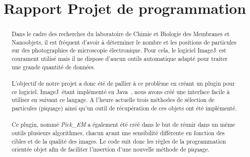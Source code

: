 \documentclass[12pt,a4paper]{report}
\title{Rapport Projet de programmation}
\begin{document}

\newcommand{\cme}{cryo-MET}
\newcommand{\me}{MET}
\newcommand{\java}{Java~{\tiny \texttrademark}}
\newcommand{\js}{JavaScript}
\newcommand{\imj}{ImageJ}
\renewcommand{\thefigure}{\arabic{figure}}

\begin{abstract}
\paragraph*{}
Dans le cadre des recherches du laboratoire de Chimie et Biologie des Membranes et Nanoobjets, il est fréquent d'avoir à déterminer le nombre et les positions de particules sur des photographies de microscopie électronique. Pour cela, le logiciel \imj ~est courament utilisé mais il ne dispose d'aucun outils automatique adapté pour traiter une grande quantité de données.
\paragraph*{}
L'objectif de notre projet a donc été de pallier à ce problème en créant un plugin pour ce logiciel. \imj ~étant implémenté en \java , nous avons créé une interface facile à utiliser en suivant ce langage. A l'heure actuelle trois méthodes de sélection de particules (piquage) ainsi qu'un outil de récupération de ces objets ont été implémenté.
\paragraph*{}
Ce plugin, nommé \emph{Pick\_EM} a également été créé dans le but de réunir dans un même outils plusieurs algorithmes, chacun ayant une sensibilité différente en fonction des cibles et de la qualité des images. Le code suit donc les règles de la programmation orientée objet afin de faciliter l'insertion d'une nouvelle méthode de piquage.


\end{abstract}
\end{document}
